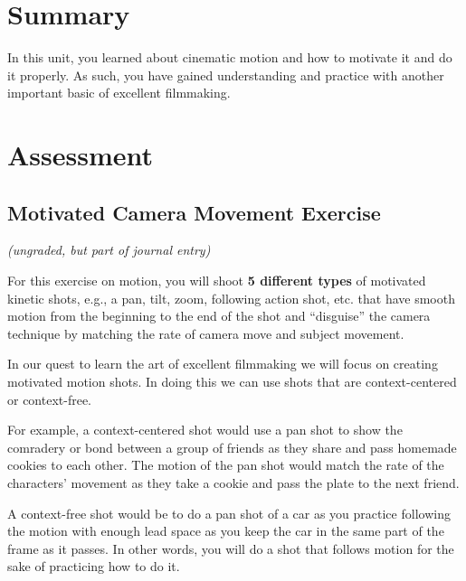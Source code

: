 \documentclass[
]{book}
\begin{document}
\hypertarget{summary-3}{%
\section*{Summary}\label{summary-3}}

In this unit, you learned about cinematic motion and how to motivate it and do it properly. As such, you have gained understanding and practice with another important basic of excellent filmmaking.

\hypertarget{assessment-4}{%
\section*{Assessment}\label{assessment-4}}

\begin{assessment}
\hypertarget{motivated-camera-movement-exercise}{%
\section*{Motivated Camera Movement Exercise}\label{motivated-camera-movement-exercise}}

\emph{(ungraded, but part of journal entry)}

For this exercise on motion, you will shoot \textbf{5 different types} of motivated kinetic shots, e.g., a pan, tilt, zoom, following action shot, etc. that have smooth motion from the beginning to the end of the shot and ``disguise'' the camera technique by matching the rate of camera move and subject movement.

In our quest to learn the art of excellent filmmaking we will focus on creating motivated motion shots. In doing this we can use shots that are context-centered or context-free.

For example, a context-centered shot would use a pan shot to show the comradery or bond between a group of friends as they share and pass homemade cookies to
each other. The motion of the pan shot would match the rate of the characters' movement as they take a cookie and pass the plate to the next friend.

A context-free shot would be to do a pan shot of a car as you practice following the motion with enough lead space as you keep the car in the same part of the
frame as it passes. In other words, you will do a shot that follows motion for the sake of practicing how to do it.


\end{assessment}
\end{document}
